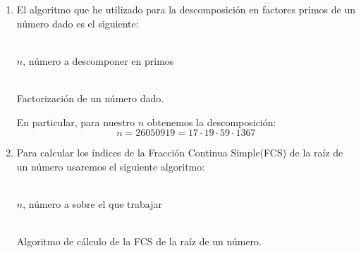 	\begin{enumerate}
		\item El algoritmo que he utilizado para la descomposición en factores primos de un número dado es el
		siguiente:
		\begin{algorithm}[H]
			\begin{algorithmic}[1]
				\REQUIRE \ \\
					\texttt{$n$}, número a descomponer en primos \\ \
					\ENDWHILE
				\ENDWHILE
				
				\ENDIF
			\end{algorithmic}
			\caption{Factorización de un número dado.}
			\label{Factors}
		\end{algorithm}
		
		En particular, para nuestro $n$ obtenemos la descomposición:
		$$n = 26050919 = 17 \cdot 19 \cdot 59 \cdot 1367$$
		
		\item Para calcular los índices de la Fracción Continua Simple(FCS) de la raíz de un número usaremos el
		siguiente algoritmo:
		\begin{algorithm}[H]
			\begin{algorithmic}[1]
				\REQUIRE \ \\
					\texttt{$n$}, número a sobre el que trabajar \\ \
				\STATE{\texttt{$i = 0$}}
				\STATE{\texttt{$P_i = 0$}}
					\PRINT{\texttt{$P_i, Q_i, q_i$}}
				\ENDWHILE
			\end{algorithmic}
			\caption{Algoritmo de cálculo de la FCS de la raíz de un número.}
			\label{FCS}
		\end{algorithm}
		

\end{enumerate}
